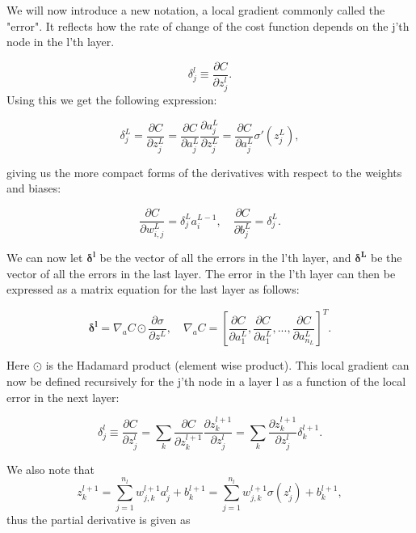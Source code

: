 We will now introduce a new notation, a local gradient commonly called the "error". It reflects how the rate of change of the cost function depends on the j'th node in the l'th layer.

\begin{equation*}
    \delta_j^l \equiv \frac{\partial C}{\partial z_j^l}.  
\end{equation*}
Using this we get the following expression:

\begin{equation*}
    \delta_j^L=  \frac{\partial C}{\partial z_j^L} = \frac{\partial C}{\partial a_j^L}\frac{\partial a_j^L}{\partial z_j^L} = \frac{\partial C}{\partial a_j^L}\sigma'(z_j^L),
\end{equation*}

giving us the more compact forms of the derivatives with respect to the weights and biases:

\begin{equation*}
    \frac{\partial C}{\partial w_{i,j}^L} = \delta_j^La_i^{L-1}, \quad \frac{\partial C}{\partial b_j^L} = \delta_j^L.
\end{equation*}

We can now let $\boldsymbol{\delta^l}$ be the vector of all the errors in the l'th layer, and $\boldsymbol{\delta^L}$ be the vector of all the errors in the last layer. 
The error in the l'th layer can then be expressed as a matrix equation for the last layer as follows:

\begin{equation*}
    \boldsymbol{\delta^l} = \nabla_aC \odot \frac{\partial \sigma}{\partial z^L}, \quad \nabla_aC = \left[\frac{\partial C}{\partial a_1^L}, \frac{\partial C}{\partial a_1^L}, ..., \frac{\partial C}{\partial a_{n_L}^L} \right]^T.
\end{equation*}

Here $\odot$ is the Hadamard product (element wise product). This local gradient can now be defined recursively for the j'th node in a layer l as a function of the local error in the next layer:

\begin{equation}
    \label{eq:localgradient}
    \delta_j^l \equiv \frac{\partial C}{\partial z_j^l} = \sum_k \frac{\partial C}{\partial z_k^{l+1}}\frac{\partial z_k^{l+1}}{\partial z_j^l} = \sum_k \frac{\partial z_k^{l+1}}{\partial z_j^l} \delta_k^{l+1}.
\end{equation}

We also note that 
\begin{equation*}
    z_k^{l+1} = \sum_{j=1}^{n_l} w_{j,k}^{l+1}a_j^l + b_k^{l+1} = \sum_{j=1}^{n_l} w_{j,k}^{l+1}\sigma(z_j^l) + b_k^{l+1},
\end{equation*} 
thus the partial derivative is given as 

